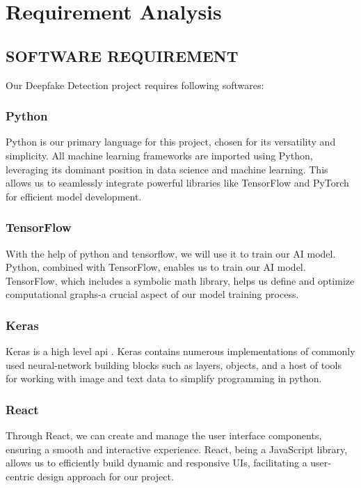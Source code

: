       \chapter{Requirement Analysis}
        \section{SOFTWARE REQUIREMENT}
            Our Deepfake Detection project requires following softwares:
            \subsection*{Python} 
            Python is our primary language for this project, chosen for its versatility and simplicity. All machine learning frameworks are imported using
            Python, leveraging its dominant position in data science and machine learning. This allows us to seamlessly integrate powerful libraries like TensorFlow and PyTorch for efficient model development.

            \subsection*{TensorFlow}
            With the help of python and tensorflow, we will use it to train our AI model. Python, combined with TensorFlow, enables us to train our AI model. TensorFlow, which includes a symbolic math library, helps us define and optimize computational graphs-a crucial aspect of our model training process.

            \subsection*{Keras}
            Keras is a high level api . Keras contains numerous implementations of commonly used neural-network building blocks such as layers, objects, and a host of tools for working with image and text data to simplify programming in python.

            \subsection*{React}
            Through React, we can create and manage the user interface components, ensuring a smooth and interactive experience. React, being a JavaScript library, allows us to efficiently build dynamic and responsive UIs, facilitating a user-centric design approach for our project.

